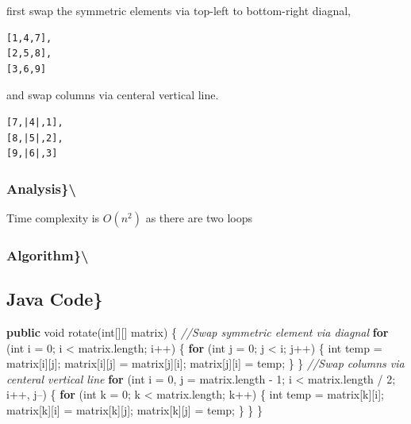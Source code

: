 \documentclass[]{book}
\newenvironment{Shaded}{\begin{snugshade}}{\end{snugshade}}
\newcommand{\CommentTok}[1]{\textcolor[rgb]{0.56,0.35,0.01}{\textit{#1}}}
\newcommand{\DataTypeTok}[1]{\textcolor[rgb]{0.13,0.29,0.53}{#1}}
\newcommand{\DecValTok}[1]{\textcolor[rgb]{0.00,0.00,0.81}{#1}}
\newcommand{\FunctionTok}[1]{\textcolor[rgb]{0.00,0.00,0.00}{#1}}
\newcommand{\KeywordTok}[1]{\textcolor[rgb]{0.13,0.29,0.53}{\textbf{#1}}}
\newcommand{\NormalTok}[1]{#1}
\begin{document}
first swap the symmetric elements via top-left to bottom-right diagnal,

\begin{verbatim}
[1,4,7],
[2,5,8],
[3,6,9]
\end{verbatim}

and swap columns via centeral vertical line.

\begin{verbatim}
[7,|4|,1],
[8,|5|,2],
[9,|6|,3]
\end{verbatim}

\hypertarget{analysis-45}{%
\subsubsection{Analysis\}\textbackslash{}}\label{analysis-45}}

Time complexity is \(O(n^2)\) as there are two loops

\hypertarget{algorithm-45}{%
\subsubsection{Algorithm\}\textbackslash{}}\label{algorithm-45}}

\hypertarget{java-code-36}{%
\subsection{Java Code\}}\label{java-code-36}}

\begin{Shaded}
\begin{Highlighting}[]
\KeywordTok{public} \DataTypeTok{void} \FunctionTok{rotate}\NormalTok{(}\DataTypeTok{int}\NormalTok{[][] matrix) \{}
    \CommentTok{//Swap symmetric element via diagnal}
    \KeywordTok{for}\NormalTok{ (}\DataTypeTok{int}\NormalTok{ i = }\DecValTok{0}\NormalTok{; i <  matrix.}\FunctionTok{length}\NormalTok{; i++) \{}
        \KeywordTok{for}\NormalTok{ (}\DataTypeTok{int}\NormalTok{ j = }\DecValTok{0}\NormalTok{; j < i; j++) \{}
            \DataTypeTok{int}\NormalTok{ temp = matrix[i][j];}
\NormalTok{            matrix[i][j] = matrix[j][i];}
\NormalTok{            matrix[j][i] = temp;}
\NormalTok{        \}}
\NormalTok{    \}}
    \CommentTok{//Swap columns via centeral vertical line}
    \KeywordTok{for}\NormalTok{ (}\DataTypeTok{int}\NormalTok{ i = }\DecValTok{0}\NormalTok{, j = matrix.}\FunctionTok{length}\NormalTok{ - }\DecValTok{1}\NormalTok{; i < matrix.}\FunctionTok{length}\NormalTok{ / }\DecValTok{2}\NormalTok{; i++, j--) \{}
        \KeywordTok{for}\NormalTok{ (}\DataTypeTok{int}\NormalTok{ k = }\DecValTok{0}\NormalTok{; k < matrix.}\FunctionTok{length}\NormalTok{; k++) \{}
            \DataTypeTok{int}\NormalTok{ temp = matrix[k][i];}
\NormalTok{            matrix[k][i] = matrix[k][j];}
\NormalTok{            matrix[k][j] = temp;}
\NormalTok{        \}}
\NormalTok{    \}}
\NormalTok{\}}
\end{Highlighting}
\end{Shaded}
\end{document}

